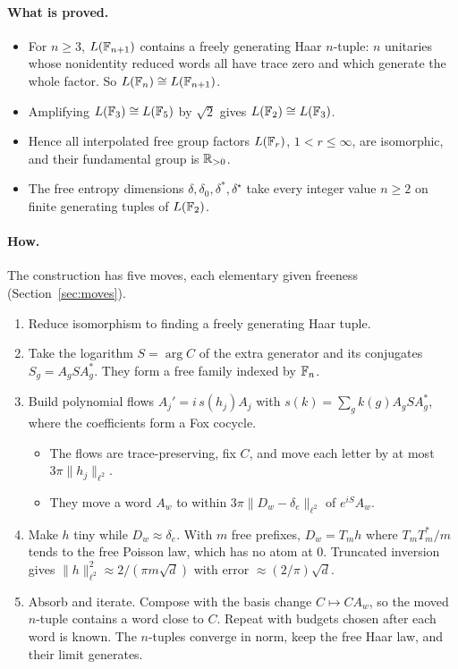 \label{sec:summary}
\paragraph{What is proved.}
\begin{itemize}[leftmargin=*]
\item For $n\ge3$, $L(\mathbb F_{n+1})$ contains a freely generating Haar $n$-tuple: $n$ unitaries whose nonidentity reduced words all have trace zero and which
generate the whole factor. So $L(\mathbb F_n)\cong L(\mathbb F_{n+1})$.
\item Amplifying $L(\mathbb F_3)\cong L(\mathbb F_5)$ by $\sqrt2$ gives $L(\mathbb F_2)\cong L(\mathbb F_3)$.
\item Hence all interpolated free group factors $L(\mathbb F_r)$, $1<r\le\infty$, are isomorphic, and their fundamental group is $\mathbb R_{>0}$.
\item The free entropy dimensions $\delta,\delta_0,\delta^*,\delta^\star$ take every integer value $n\ge2$ on finite generating tuples of $L(\mathbb F_2)$.
\end{itemize}
\paragraph{How.} The construction has five moves, each elementary given freeness (Section~\ref{sec:moves}).
\begin{enumerate}[leftmargin=*]
\item Reduce isomorphism to finding a freely generating Haar tuple.
\item Take the logarithm $S=\arg C$ of the extra generator and its conjugates $S_g=A_gSA_g^*$. They form a free family indexed by $\mathbb F_n$.
\item Build polynomial flows $A_j'=i\,s(h_j)A_j$ with $s(k)=\sum_gk(g)A_gSA_g^*$, where the coefficients form a Fox cocycle.
\begin{itemize}
\item The flows are trace-preserving, fix $C$, and move each letter by at most $3\pi\|h_j\|_{\ell^2}$.
\item They move a word $A_w$ to within $3\pi\|D_w-\delta_e\|_{\ell^2}$ of $e^{iS}A_w$.
\end{itemize}
\item Make $h$ tiny while $D_w\approx\delta_e$. With $m$ free prefixes, $D_w=T_mh$ where $T_mT_m^*/m$ tends to the free Poisson law, which has no atom at $0$.
Truncated inversion gives $\|h\|_{\ell^2}^2\approx2/(\pi m\sqrt d)$ with error $\approx(2/\pi)\sqrt d$.
\item Absorb and iterate. Compose with the basis change $C\mapsto CA_w$, so the moved $n$-tuple contains a word close to $C$. Repeat with budgets chosen
after each word is known. The $n$-tuples converge in norm, keep the free Haar law, and their limit generates.
\end{enumerate}
